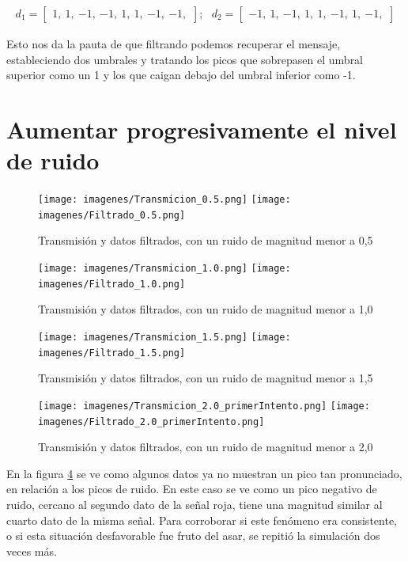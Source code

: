\documentclass[12pt,letterpaper]{article}     %
\begin{document}
\begin{align*}
	d_{1} =
	\begin{bmatrix}
		{1,}\ 
		{1,}\ 
		{-1,}\ 
		{-1,}\ 
		{1,}\ 
		{1,}\ 
		{-1,}\ 
		{-1,}
	\end{bmatrix};\ \ \ 
	d_{2} =
	\begin{bmatrix}
		{-1,}\ 
		{1,}\ 
		{-1,}\ 
		{1,}\ 
		{1,}\ 
		{-1,}\ 
		{1,}\ 
		{-1,}
	\end{bmatrix}
\end{align*}

Esto nos da la pauta de que filtrando podemos recuperar el mensaje, estableciendo dos umbrales
y tratando los picos que sobrepasen el umbral superior como un 1 y los que caigan debajo del 
umbral inferior como -1.

\newpage
\section{Aumentar progresivamente el nivel de ruido}

\begin{figure}[!ht]
\centering
\texttt{[image: imagenes/Transmicion\_0.5.png]}
\texttt{[image: imagenes/Filtrado\_0.5.png]}
\caption{Transmisión y datos filtrados, con un ruido de magnitud menor a 0,5}
\label{fig:filtro05}
\end{figure}

\begin{figure}[!ht]
\centering
\texttt{[image: imagenes/Transmicion\_1.0.png]}
\texttt{[image: imagenes/Filtrado\_1.0.png]}
\caption{Transmisión y datos filtrados, con un ruido de magnitud menor a 1,0}
\label{fig:filtro10}
\end{figure}

\begin{figure}[!ht]
\centering
\texttt{[image: imagenes/Transmicion\_1.5.png]}
\texttt{[image: imagenes/Filtrado\_1.5.png]}
\caption{Transmisión y datos filtrados, con un ruido de magnitud menor a 1,5}
\label{fig:filtro15}
\end{figure}

\clearpage

\begin{figure}[!ht]
\centering
\texttt{[image: imagenes/Transmicion\_2.0\_primerIntento.png]}
\texttt{[image: imagenes/Filtrado\_2.0\_primerIntento.png]}
\caption{Transmisión y datos filtrados, con un ruido de magnitud menor a 2,0}
\label{fig:filtro201}
\end{figure}

En la figura \ref{fig:filtro201} se ve como algunos datos ya no muestran un pico tan pronunciado,
en relación a los picos de ruido. En este caso se ve como un pico negativo de ruido,
cercano al segundo dato de la señal roja, tiene una magnitud similar al cuarto dato de la misma señal.
Para corroborar si este fenómeno era consistente, o si esta situación desfavorable fue fruto del asar,
se repitió la simulación dos veces más.
\end{document}
